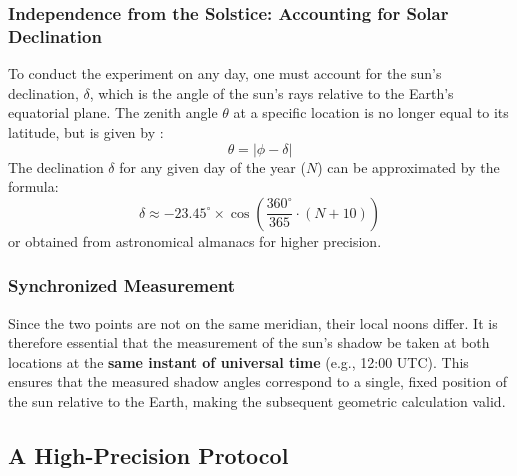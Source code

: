\documentclass[11pt]{article}
\begin{document}
\subsubsection{Independence from the Solstice: Accounting for Solar Declination}
To conduct the experiment on any day, one must account for the sun’s declination, $\delta$, which is the angle of the sun's rays relative to the Earth's equatorial plane. The zenith angle $\theta$ at a specific location is no longer equal to its latitude, but is given by \cite{Meeus1998}:
\begin{equation}
    \theta = |\phi - \delta|
    \label{eq:zenith_declination}
\end{equation}
The declination $\delta$ for any given day of the year ($N$) can be approximated by the formula:
\begin{equation}
    \delta \approx -23.45^{\circ} \times \cos\left( \frac{360^{\circ}}{365} \cdot (N + 10) \right)
    \label{eq:declination}
\end{equation}
or obtained from astronomical almanacs for higher precision.

\subsubsection{Synchronized Measurement}
Since the two points are not on the same meridian, their local noons differ. It is therefore essential that the measurement of the sun's shadow be taken at both locations at the \textbf{same instant of universal time} (e.g., 12:00 UTC). This ensures that the measured shadow angles correspond to a single, fixed position of the sun relative to the Earth, making the subsequent geometric calculation valid.

\subsection{A High-Precision Protocol}
\end{document}
